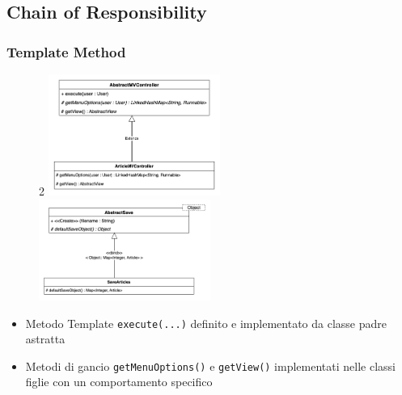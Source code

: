 \subsection{Chain of Responsibility}
\begin{frame}
    \frametitle{Template Method}
    \begin{figure}
        \begin{multicols} {2}
            \includegraphics[width=0.5\textwidth]{img/templateMethod_Controller.png}
            \columnbreak
            \includegraphics[width=0.5\textwidth]{img/templateMethod_Save.png}
        \end{multicols}
    \end{figure}
    \begin{itemize}
        \item Metodo Template \texttt{execute(...)} definito e implementato da classe padre astratta
        \item Metodi di gancio \texttt{getMenuOptions()} e \texttt{getView()} implementati nelle classi figlie con un comportamento specifico
    \end{itemize}
\end{frame}